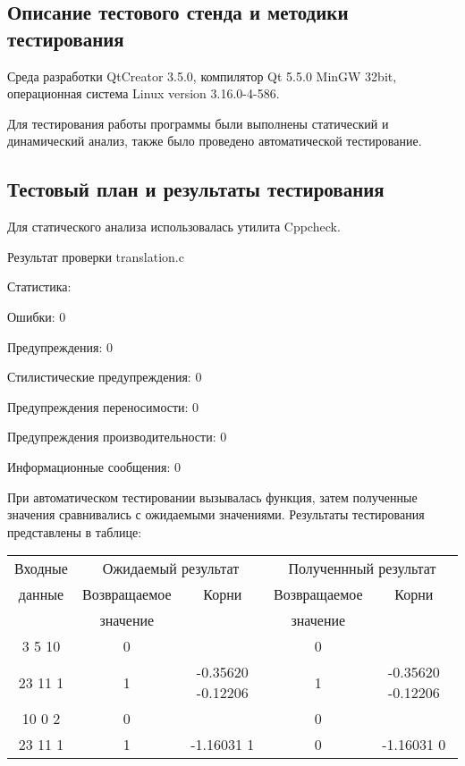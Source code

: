 \documentclass[12pt,a4paper]{report}
\begin{document}
\subsection{Описание тестового стенда и методики тестирования}
Среда разработки QtCreator 3.5.0, компилятор Qt 5.5.0 MinGW 32bit, операционная система Linux version 3.16.0-4-586.

Для тестирования работы программы были выполнены статический и динамический анализ, также было проведено автоматической тестирование.

\subsection{Тестовый план и результаты тестирования}
		Для статического анализа использовалась утилита Cppcheck.
		
		\vspace{\baselineskip}
		Результат проверки translation.c 
		
		Статистика:
		
		Ошибки:	0
		
		Предупреждения:	0
		
		Стилистические предупреждения:	0
		
		Предупреждения переносимости:	0
		
		Предупреждения производительности:	0
		
		Информационные сообщения:	0
		
		\vspace{\baselineskip}
		При автоматическом тестировании вызывалась функция, затем полученные значения сравнивались с ожидаемыми значениями. Результаты тестирования представлены в таблице:  
		
		\vspace{\baselineskip}
	 

 \begin{tabular}{|c|c|c|c|c|}
	\hline 	
	Входные & \multicolumn{2}{|c|}{Ожидаемый результат} & \multicolumn{2}{|c|}{Полученнный результат} \\
	\cline{2-5}
	данные & Возвращаемое & Корни & Возвращаемое & Корни \\
	 & значение & & значение & \\
	\hline
	3 5 10 & 0 & & 0 & \\
	\hline
	23 11 1 & 1 & -0.35620 -0.12206 & 1 & -0.35620 -0.12206\\
	\hline
	10 0 2 & 0 & & 0 & \\
	\hline
	23 11 1 & 1 & -1.16031 1 & 0 & -1.16031 0 \\
	\hline

 \end{tabular}
 
\end{document}
